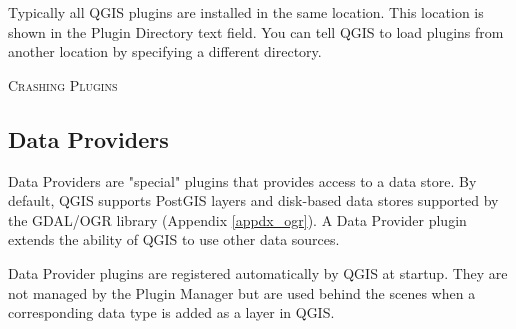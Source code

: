Typically all QGIS plugins are installed in the same location.
This location is shown in the Plugin Directory text field.
You can tell QGIS to load plugins from another location by specifying a different directory.

\begin{Tip}\caption{\textsc{Crashing Plugins}}
\end{Tip} 

\subsection{Data Providers}

Data Providers are "special" plugins that provides access to a data store.
By default, QGIS supports PostGIS layers and disk-based data stores supported by the GDAL/OGR library (Appendix \ref{appdx_ogr}).
A Data Provider plugin extends the ability of QGIS to use other data sources.

Data Provider plugins are registered automatically by QGIS at startup.
They are not managed by the Plugin Manager but are used behind the scenes when a corresponding data type is added as a layer in QGIS.

